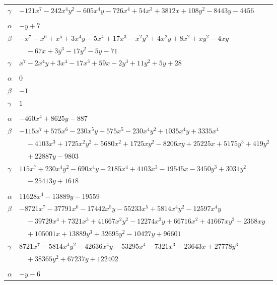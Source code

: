 \documentclass[11pt]{article}
\begin{document}
\begin{longtable}{@{}ll@{}}
$\gamma$ & $-121x^{7}-242x^{4}y^{2}-605x^{4}y-726x^{4}+54x^{3}+3812x+108y^{2}-8443y-4456$\\
\addlinespace[3pt]
\multicolumn{2}{@{}l}{$\{i,j\}=\{29,38\}$, $k_{ij}=2^{2}\cdot 3^{2}$}\\
$\alpha$ & $-y+7$\\
$\beta$ & $-x^{7}-x^{6}+x^{5}+3x^{4}y-5x^{4}+17x^{3}-x^{2}y^{2}+4x^{2}y+8x^{2}+xy^{2}-4xy$\\
 & $\quad -67x+3y^{3}-17y^{2}-5y-71$\\
$\gamma$ & $x^{7}-2x^{4}y+3x^{4}-17x^{3}+59x-2y^{3}+11y^{2}+5y+28$\\
\addlinespace[3pt]
\multicolumn{2}{@{}l}{$\{i,j\}=\{30,39\}$, $k_{ij}=1$}\\
$\alpha$ & $0$\\
$\beta$ & $-1$\\
$\gamma$ & $1$\\
\addlinespace[3pt]
\multicolumn{2}{@{}l}{$\{i,j\}=\{31,35\}$, $k_{ij}=2^{4}\cdot 3^{4}\cdot 7$}\\
$\alpha$ & $-460x^{4}+8625y-887$\\
$\beta$ & $-115x^{7}+575x^{6}-230x^{5}y+575x^{5}-230x^{4}y^{2}+1035x^{4}y+3335x^{4}$\\
 & $\quad -4103x^{3}+1725x^{2}y^{2}+5680x^{2}+1725xy^{2}-8206xy+25225x+5175y^{3}+419y^{2}$\\
 & $\quad +22887y-9803$\\
$\gamma$ & $115x^{7}+230x^{4}y^{2}-690x^{4}y-2185x^{4}+4103x^{3}-19545x-3450y^{3}+3031y^{2}$\\
 & $\quad -25413y+1618$\\
\addlinespace[3pt]
\multicolumn{2}{@{}l}{$\{i,j\}=\{31,39\}$, $k_{ij}=2^{4}\cdot 3^{4}\cdot 5\cdot 7$}\\
$\alpha$ & $11628x^{4}-13889y-19559$\\
$\beta$ & $-8721x^{7}-37791x^{6}-17442x^{5}y-55233x^{5}+5814x^{4}y^{2}-12597x^{4}y$\\
 & $\quad -39729x^{4}+7321x^{3}+41667x^{2}y^{2}-12274x^{2}y+66716x^{2}+41667xy^{2}+2368xy$\\
 & $\quad +105001x+13889y^{3}+32695y^{2}-10427y+96601$\\
$\gamma$ & $8721x^{7}-5814x^{4}y^{2}-42636x^{4}y-53295x^{4}-7321x^{3}-23643x+27778y^{3}$\\
 & $\quad +38365y^{2}+67237y+122402$\\
\addlinespace[3pt]
\multicolumn{2}{@{}l}{$\{i,j\}=\{33,34\}$, $k_{ij}=2^{3}\cdot 5$}\\
$\alpha$ & $-y-6$\\

\end{longtable}
\end{document}
